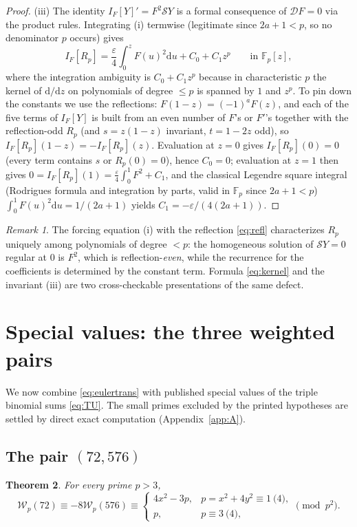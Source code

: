 \documentclass[11pt]{amsart}
\newtheorem{theorem}{Theorem}[section]
\theoremstyle{definition}
\theoremstyle{remark}
\newtheorem{remark}[theorem]{Remark}
\newcommand{\dd}{\mathrm{d}}
\newcommand{\Fp}{\mathbb{F}_p}
\begin{document}
\begin{proof}
(iii) The identity $I_F[Y]'=F^2\mathcal SY$ is a formal consequence of
$\mathcal DF=0$ via the product rules. Integrating (i) termwise
(legitimate since $2a+1<p$, so no denominator $p$ occurs) gives
\[
I_F[R_p]=\frac{\varepsilon}{4}\int_0^zF(u)^2\dd u+C_0+C_1z^p
\qquad\text{in }\Fp[z],
\]
where the integration ambiguity is $C_0+C_1z^p$ because in
characteristic $p$ the kernel of $\dd/\dd z$ on polynomials of degree
$\le p$ is spanned by $1$ and $z^p$. To pin down the constants we use
the reflections: $F(1-z)=(-1)^aF(z)$, and each of the five terms of
$I_F[Y]$ is built from an even number of $F$'s or $F'$'s together with
the reflection-odd $R_p$ (and $s=z(1-z)$ invariant, $t=1-2z$ odd), so
$I_F[R_p](1-z)=-I_F[R_p](z)$. Evaluation at $z=0$ gives
$I_F[R_p](0)=0$ (every term contains $s$ or $R_p(0)=0$), hence
$C_0=0$; evaluation at $z=1$ then gives
$0=I_F[R_p](1)=\frac{\varepsilon}{4}\int_0^1F^2+C_1$, and the
classical Legendre square integral (Rodrigues formula and integration
by parts, valid in $\Fp$ since $2a+1<p$)
$\int_0^1F(u)^2\dd u=1/(2a+1)$ yields $C_1=-\varepsilon/(4(2a+1))$.
\end{proof}

\begin{remark}
The forcing equation (i) with the reflection \eqref{eq:refl}
characterizes $R_p$ uniquely among polynomials of degree $<p$: the
homogeneous solution of $\mathcal SY=0$ regular at $0$ is $F^2$, which
is reflection-\emph{even}, while the recurrence for the coefficients is
determined by the constant term. Formula \eqref{eq:kernel} and the
invariant (iii) are two cross-checkable presentations of the same
defect.
\end{remark}

\section{Special values: the three weighted pairs}\label{sec:6}

We now combine \eqref{eq:eulertrans} with published special values of
the triple binomial sums \eqref{eq:TU}. The small primes excluded by the
printed hypotheses are settled by direct exact computation
(Appendix~\ref{app:A}).

\subsection{The pair \texorpdfstring{$(72,576)$}{(72,576)}}

\begin{theorem}\label{thm:grpA}
For every prime $p>3$,
\[
\mathcal W_p(72)\equiv-8\mathcal W_p(576)\equiv
\begin{cases}
4x^2-3p,&p=x^2+4y^2\equiv1\pod4,\\
p,&p\equiv3\pod4,
\end{cases}
\pmod{p^2}.
\]
\end{theorem}
\end{document}
